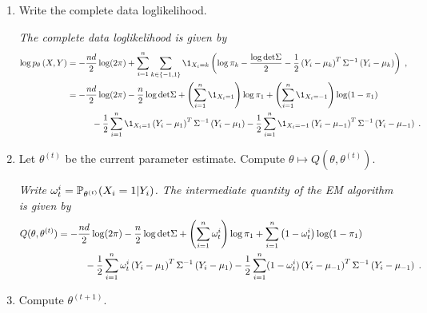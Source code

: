 \begin{enumerate}
\item Write the complete data loglikelihood.

\vspace{.2cm}

{\em
The complete data loglikelihood  is given by
\begin{align*}
\log p_{\theta}\left(X,Y\right) &= - \frac{nd}{2} \log(2\pi)+\sum_{i=1}^n\sum_{k\in\{-1,1\}}\1_{X_i=k}\left(\log \pi_{k} -\frac{\log \det \Sigma}{2} - \frac{1}{2}\left(Y_i - \mu_{k}\right)^T\Sigma^{-1}\left(Y_i - \mu_{k}\right)\right) \eqsp,\\
&= - \frac{nd}{2} \log(2\pi)-\frac{n}2 \log\det\Sigma + \left(\sum_{i=1}^n\1_{X_i=1}\right)\log \pi_1 + \left(\sum_{i=1}^n\1_{X_i=-1}\right)\log (1-\pi_{1})\\
& \hspace{1cm}-  \frac{1}{2}\sum_{i=1}^n\1_{X_i=1}\left(Y_i - \mu_{1}\right)^T\Sigma^{-1}\left(Y_i - \mu_{1}\right) -  \frac{1}{2}\sum_{i=1}^n\1_{X_i=-1}\left(Y_i - \mu_{-1}\right)^T\Sigma^{-1}\left(Y_i - \mu_{-1}\right)\eqsp.
\end{align*}
}
\item Let $\theta^{(t)}$ be the current parameter estimate. Compute $\theta\mapsto Q(\theta,\theta^{(t)})$.

\vspace{.2cm}

{\em
Write $\omega_t^i = \mathbb{P}_{\theta^{(t)}}(X_i=1|Y_i)$. The intermediate quantity of the EM algorithm is given by
\begin{align*}
Q(\theta,\theta^{(t)}) &= - \frac{nd}{2} \log(2\pi)-\frac{n}2 \log\mathrm{det}\Sigma + \left(\sum_{i=1}^n\omega_t^i \right)\log \pi_1 + \sum_{i=1}^n\left(1 - \omega_t^i \right)\log (1-\pi_{1})\\
& \hspace{1cm}-  \frac{1}{2}\sum_{i=1}^n\omega_t^i \left(Y_i - \mu_{1}\right)^T\Sigma^{-1}\left(Y_i - \mu_{1}\right) -  \frac{1}{2}\sum_{i=1}^n(1-\omega_t^i )\left(Y_i - \mu_{-1}\right)^T\Sigma^{-1}\left(Y_i - \mu_{-1}\right)\;.
\end{align*}
}
\item Compute $\theta^{(t+1)}$.

\vspace{.2cm}


\end{enumerate}
